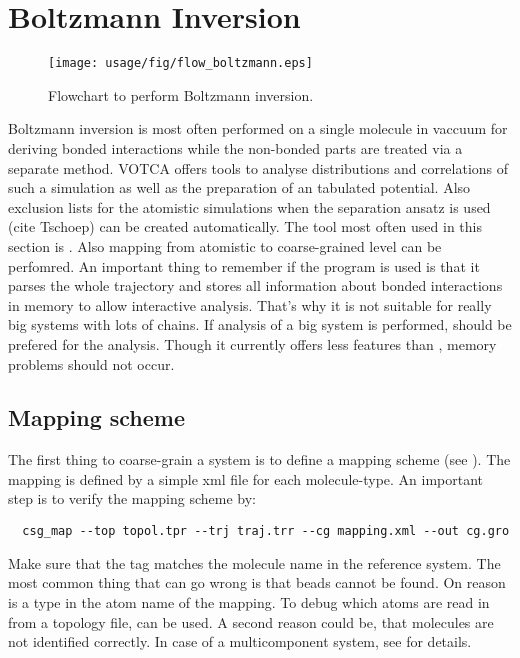 \section{Boltzmann Inversion}
\begin{figure}
   \centering
   \texttt{[image: usage/fig/flow\_boltzmann.eps]}
   \caption{Flowchart to perform Boltzmann inversion.}
\end{figure}

Boltzmann inversion is most often performed on a single molecule in vaccuum for deriving bonded interactions while the non-bonded parts are treated via a separate method. VOTCA offers tools to analyse distributions and correlations of such a simulation as well as the preparation of an tabulated potential. Also exclusion lists for the atomistic simulations when the separation ansatz is used (cite Tschoep) can be created automatically. The tool most often used in this section is . Also mapping from atomistic to coarse-grained level can be perfomred. An important thing to remember if the program  is used is that it parses the whole trajectory and stores all information about bonded interactions in memory to allow interactive analysis. That's why it is not suitable for really big systems with lots of chains. If analysis of a big system is performed,  should be prefered for the analysis. Though it currently offers less features than , memory problems should not occur.

\subsection{Mapping scheme}
The first thing to coarse-grain a system is to define a mapping scheme (see ). The mapping is defined by a simple xml file for each molecule-type. An important step is to verify the mapping scheme by:

\begin{verbatim}
  csg_map --top topol.tpr --trj traj.trr --cg mapping.xml --out cg.gro
\end{verbatim}

Make sure that the  tag matches the molecule name in the reference system. The most common thing that can go wrong is that beads cannot be found. On reason is a type in the atom name of the mapping. To debug which atoms are read in from a topology file,  can be used. A second reason could be, that molecules are not identified correctly. In case of a multicomponent system, see  for details.

